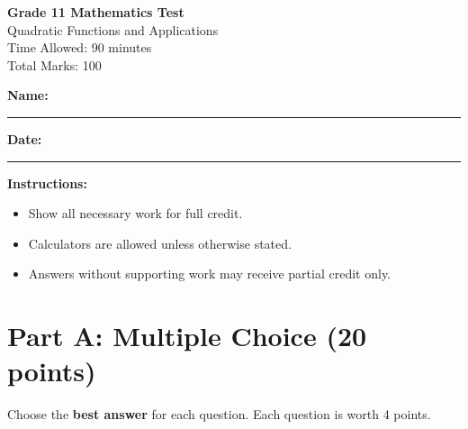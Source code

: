 \documentclass[12pt]{article}
\begin{document}
\begin{center}
    \Large \textbf{Grade 11 Mathematics Test} \\
    \normalsize Quadratic Functions and Applications \\
    \vspace{0.2cm}
    Time Allowed: 90 minutes \\
    Total Marks: 100
\end{center}

\vspace{0.3cm}

\noindent
\textbf{Name:} \rule{7cm}{0.4pt} \hfill
\textbf{Date:} \rule{4cm}{0.4pt}

\vspace{0.5cm}

\noindent
\textbf{Instructions:}
\begin{itemize}
    \item Show all necessary work for full credit.
    \item Calculators are allowed unless otherwise stated.
    \item Answers without supporting work may receive partial credit only.
\end{itemize}

\vspace{0.5cm}

\section*{Part A: Multiple Choice (20 points)}

Choose the \textbf{best answer} for each question. Each question is worth 4 points.
\end{document}
